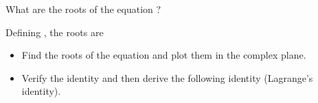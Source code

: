 \begin{EMimportant}{}


\end{EMimportant}

\begin{EMexample}{}

What are the roots of the equation ?

Defining , the roots are

\end{EMexample}

\begin{EMunit}


\end{EMunit}

\begin{EMexercise}{}

\begin{itemize}
\tightlist
\item
  Find the roots of the equation  and plot them in the complex plane.
\item
  Verify the identity  and then derive the following identity (Lagrange's identity).
\end{itemize}

\end{EMexercise}
